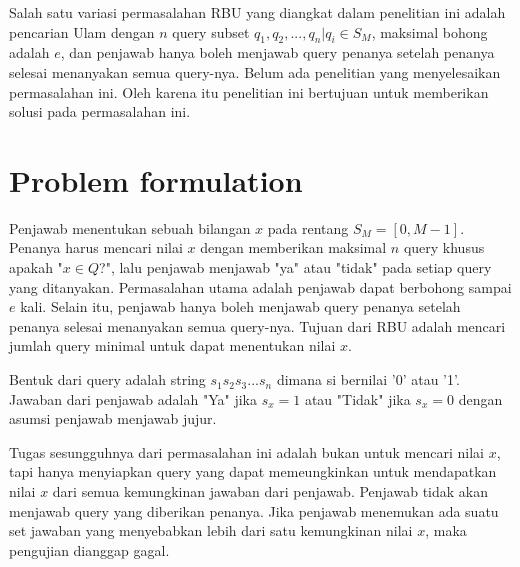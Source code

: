 \documentclass[conference,compsoc]{IEEEtran}
\begin{document}
Salah satu variasi permasalahan RBU yang diangkat dalam penelitian ini adalah pencarian Ulam dengan $n$ query subset ${q_1,q_2,...,q_n} | q_i \in S_M$, maksimal bohong adalah $e$, dan penjawab hanya boleh menjawab query penanya setelah penanya selesai menanyakan semua query-nya. Belum ada penelitian yang menyelesaikan permasalahan ini. Oleh karena itu penelitian ini bertujuan untuk memberikan solusi pada permasalahan ini.

\section{Problem formulation}

Penjawab menentukan sebuah bilangan $x$ pada rentang $S_M=[0,M-1]$. Penanya harus mencari nilai $x$ dengan memberikan maksimal $n$ query khusus apakah "$x \in Q$?", lalu penjawab menjawab "ya" atau "tidak" pada setiap query yang ditanyakan. Permasalahan utama adalah penjawab dapat berbohong sampai $e$ kali. Selain itu, penjawab hanya boleh menjawab query penanya setelah penanya selesai menanyakan semua query-nya. Tujuan dari RBU adalah mencari jumlah query minimal untuk dapat menentukan nilai $x$.

Bentuk dari query adalah string $s_1s_2s_3...s_n$ dimana si bernilai '0' atau '1'. Jawaban dari penjawab adalah "Ya" jika $s_x=1$ atau "Tidak" jika $s_x=0$ dengan asumsi penjawab menjawab jujur.

Tugas sesungguhnya dari permasalahan ini adalah bukan untuk mencari nilai $x$, tapi hanya menyiapkan query yang dapat memeungkinkan untuk mendapatkan nilai $x$ dari semua kemungkinan jawaban dari penjawab. Penjawab tidak akan menjawab query yang diberikan penanya. Jika penjawab menemukan ada suatu set jawaban yang menyebabkan lebih dari satu kemungkinan nilai $x$, maka pengujian dianggap gagal.
\end{document}

